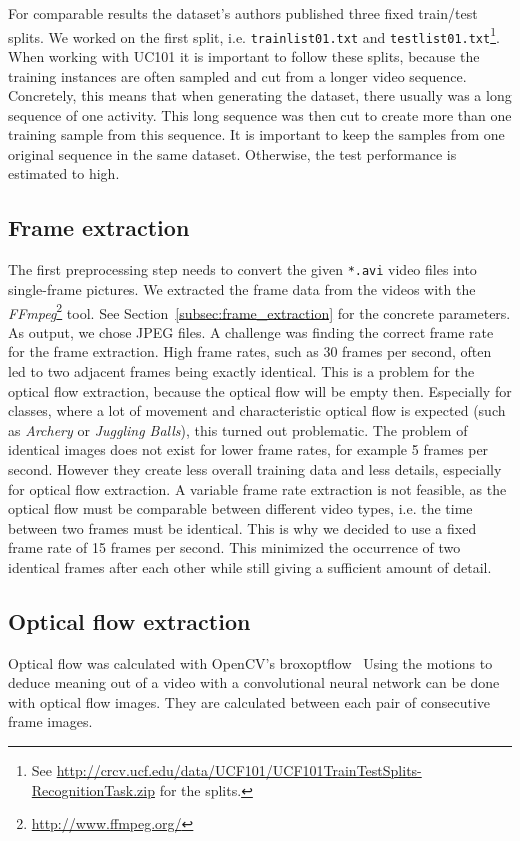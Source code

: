 For comparable results the dataset's authors published three fixed train/test splits.
We worked on the first split, i.e. \texttt{trainlist01.txt} and \texttt{testlist01.txt}\footnote{See \url{http://crcv.ucf.edu/data/UCF101/UCF101TrainTestSplits-RecognitionTask.zip} for the splits.}.
When working with UC101 it is important to follow these splits, because the training instances are often sampled and cut from a longer video sequence.
Concretely, this means that when generating the dataset, there usually was a long sequence of one activity.
This long sequence was then cut to create more than one training sample from this sequence.
It is important to keep the samples from one original sequence in the same dataset.
Otherwise, the test performance is estimated to high.

\subsection{Frame extraction}
The first preprocessing step needs to convert the given \texttt{*.avi} video files into single-frame pictures.
We extracted the frame data from the videos with the \emph{FFmpeg}\footnote{\url{http://www.ffmpeg.org/}} tool.
See Section~\ref{subsec:frame_extraction} for the concrete parameters.
As output, we chose JPEG files.
A challenge was finding the correct frame rate for the frame extraction.
High frame rates, such as 30 frames per second, often led to two adjacent frames being exactly identical.
This is a problem for the optical flow extraction, because the optical flow will be empty then.
Especially for classes, where a lot of movement and characteristic optical flow is expected (such as \emph{Archery} or \emph{Juggling Balls}), this turned out problematic.
The problem of identical images does not exist for lower frame rates, for example 5 frames per second.
However they create less overall training data and less details, especially for optical flow extraction.
A variable frame rate extraction is not feasible, as the optical flow must be comparable between different video types, i.e. the time between two frames must be identical.
This is why we decided to use a fixed frame rate of 15  frames per second.
This minimized the occurrence of two identical frames after each other while still giving a sufficient amount of detail.

\subsection{Optical flow extraction}
\item Optical flow was calculated with OpenCV's broxoptflow~\cite{brox2004high}
Using the motions to deduce meaning out of a video with a convolutional neural network can be done with optical flow images.
They are calculated between each pair of consecutive frame images.

